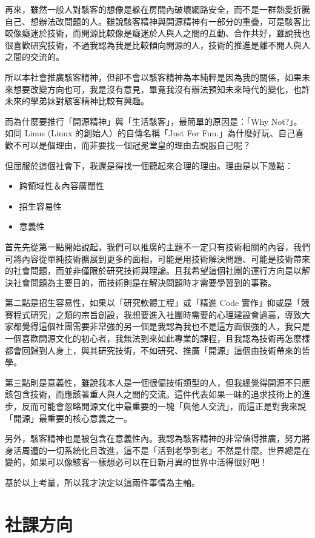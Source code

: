 \documentclass[12pt, a4paper]{NGPLB}
\begin{document}
再來，雖然一般人對駭客的想像是躲在房間內破壞網路安全，而不是一群熱愛折騰自己、想辦法改問題的人。雖說駭客精神與開源精神有一部分的重疊，可是駭客比較像癡迷於技術，而開源比較像是癡迷於人與人之間的互動、合作共好，雖說我也很喜歡研究技術，不過我認為我是比較傾向開源的人，技術的推進是離不開人與人之間的交流的。

所以本社會推廣駭客精神，但卻不會以駭客精神為本純粹是因為我的關係，如果未來想要改變方向也可，我是沒有意見，畢竟我沒有辦法預知未來時代的變化，也許未來的學弟妹對駭客精神比較有興趣。

而為什麼要推行「開源精神」與「生活駭客」，最簡單的原因是：「Why Not?」。如同 Linus (Linux 的創始人）的自傳名稱「Just For Fun.」為什麼好玩、自己喜歡不可以是個理由，而非要找一個冠冕堂皇的理由去說服自己呢？

但屈服於這個社會下，我還是得找一個聽起來合理的理由。理由是以下幾點：

\begin{itemize}
\item 跨領域性＆內容廣闊性
\item 招生容易性
\item 意義性
\end{itemize}

首先先從第一點開始說起，我們可以推廣的主題不一定只有技術相關的內容，我們可將內容從單純技術擴展到更多的面相，可能是用技術解決問題、可能是技術帶來的社會問題，而並非僅限於研究技術與理論。且我希望這個社團的運行方向是以解決社會問題為主要目的，而技術則是在解決問題時才需要學習到的事務。

第二點是招生容易性，如果以「研究軟體工程」或「精進 Code 實作」抑或是「競賽程式研究」之類的宗旨創設，我想要進入社團時需要的心理建設會過高，導致大家都覺得這個社團需要非常強的另一個是我認為我也不是這方面很強的人，我只是一個喜歡開源文化的初心者，我無法到來如此專業的課程，且我認為技術再怎麼樣都會回歸到人身上，與其研究技術，不如研究、推廣「開源」這個由技術帶來的哲學。

第三點則是意義性，雖說我本人是一個很偏技術類型的人，但我總覺得開源不只應該包含技術，而應該著重人與人之間的交流。這件代表如果一昧的追求技術上的進步，反而可能會忽略開源文化中最重要的一塊「與他人交流」，而這正是對我來說「開源」最重要的核心意義之一。

另外，駭客精神也是被包含在意義性內。我認為駭客精神的非常值得推廣，努力將身活周遭的一切系統化且改進，這不是「活到老學到老」不然是什麼。世界總是在變的，如果可以像駭客一樣想必可以在日新月異的世界中活得很好吧！

基於以上考量，所以我才決定以這兩件事情為主軸。

\section{社課方向}
\end{document}
